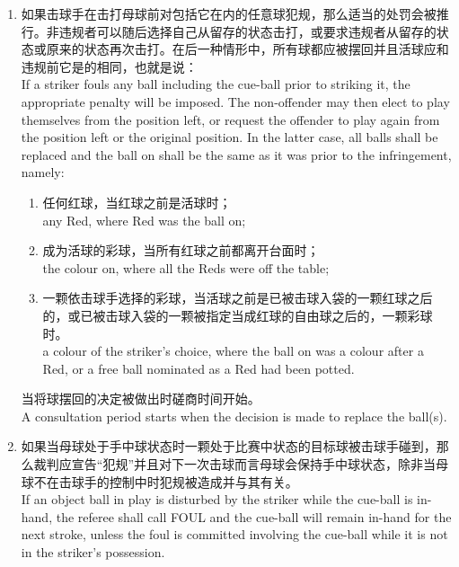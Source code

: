 \begin{enumerate}[label=(\alph*)]
\begin{enumerate}[label=(\roman*)]
        incurs the penalty points prescribed in Section \ref{223} Rule \ref{22311}; and
        \item 若被下一位球员要求则必须进行下一次击球。\\
        has to play the next stroke if requested by the next player.
    \end{enumerate}
    \item \label{22310i}如果击球手在击打母球前对包括它在内的任意球犯规，那么适当的处罚会被推行。非违规者可以随后选择自己从留存的状态击打，或要求违规者从留存的状态或原来的状态再次击打。在后一种情形中，所有球都应被摆回并且活球应和违规前它是的相同，也就是说：\\
    If a striker fouls any ball including the cue-ball prior to striking it, the appropriate penalty will be imposed. The non-offender may then elect to play themselves from the position left, or request the offender to play again from the position left or the original position. In the latter case, all balls shall be replaced and the ball on shall be the same as it was prior to the infringement, namely:
    \begin{enumerate}[label=(\roman*)]
        \item 任何红球，当红球之前是活球时；\\
        any Red, where Red was the ball on;
        \item 成为活球的彩球，当所有红球之前都离开台面时；\\
        the colour on, where all the Reds were off the table;
        \item 一颗依击球手选择的彩球，当活球之前是已被击球入袋的一颗红球之后的，或已被击球入袋的一颗被指定当成红球的自由球之后的，一颗彩球时。\\
        a colour of the striker's choice, where the ball on was a colour after a Red, or a free ball nominated as a Red had been potted.
    \end{enumerate}
    当将球摆回的决定被做出时磋商时间开始。\\
    A consultation period starts when the decision is made to replace the ball(s).
    \item 如果当母球处于手中球状态时一颗处于比赛中状态的目标球被击球手碰到，那么裁判应宣告“犯规”并且对下一次击球而言母球会保持手中球状态，除非当母球不在击球手的控制中时犯规被造成并与其有关。\\
    If an object ball in play is disturbed by the striker while the cue-ball is in-hand, the referee shall call FOUL and the cue-ball will remain in-hand for the next stroke, unless the foul is committed involving the cue-ball while it is not in the striker's possession.
\end{enumerate}

